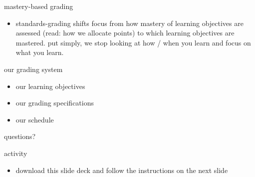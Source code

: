 \documentclass[10pt,t,usenames,dvipsnames]{beamer}
\begin{document}
\begin{frame}{mastery-based grading}
{\begin{itemize}
        \item standards-grading shifts focus from how mastery of learning
          objectives are assessed (read: how we allocate points) to which
          learning objectives are mastered. put simply, we stop looking at how /
          when you learn and focus on what you learn.
      \end{itemize}
    }
  \end{frame}

  \begin{frame}{our grading system}
    \begin{itemize}[itemsep=10pt]
      \item our learning objectives
      \item our grading specifications
      \item our schedule
    \end{itemize}

  \end{frame}

  \begin{frame}[standout]
    \ifnotes
    \fi
    questions?
  \end{frame}

  \appendix

  \begin{frame}[standout]{activity}
    \ifnotes
    \fi

    \begin{itemize}
      \item download this slide deck and follow the instructions on the next
        slide
    \end{itemize}

  \end{frame}
\end{document}
